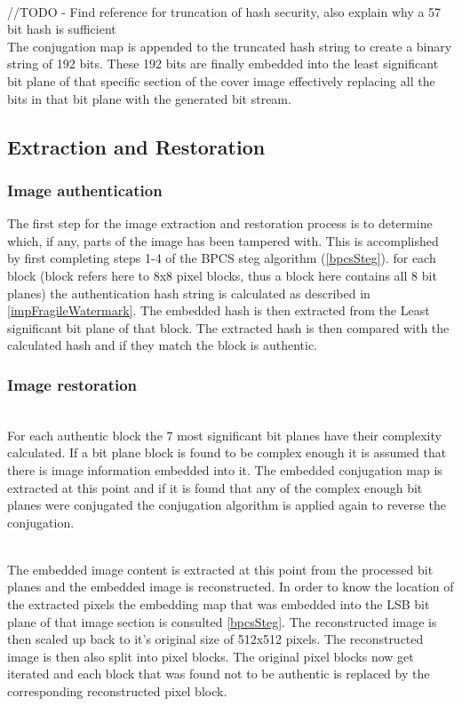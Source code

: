 \documentclass[12pt]{article}
\begin{document}
\hspace{0pt} \\
//TODO - Find reference for truncation of hash security, also explain why a 57 bit hash is sufficient
\hspace{0pt} \\

The conjugation map is appended to the truncated hash string to create a binary string of 192 bits.
These 192 bits are finally embedded into the least significant bit plane of that specific section of the cover image effectively replacing all the bits in that bit plane with the generated bit stream.

\subsection{Extraction and Restoration}
\label{extractRestore}
\subsubsection{Image authentication}
The first step for the image extraction and restoration process is to determine which, if any, parts of the image has been tampered with.
This is accomplished by first completing steps 1-4 of the BPCS steg algorithm (\ref{bpcsSteg}).
for each block (block refers here to 8x8 pixel blocks, thus a block here contains all 8 bit planes) the authentication hash string is calculated as described in \ref{impFragileWatermark}. 
The embedded hash is then extracted from the Least significant bit plane of that block.
The extracted hash is then compared with the calculated hash and if they match the block is authentic.

\subsubsection{Image restoration}
\hspace{0pt} \\
For each authentic block the 7 most significant bit planes have their complexity calculated.
If a bit plane block is found to be complex enough it is assumed that there is image information embedded into it.
The embedded conjugation map is extracted at this point and if it is found that any of the complex enough bit planes were conjugated the conjugation algorithm is applied again to reverse the conjugation.

\hspace{0pt} \\
The embedded image content is extracted at this point from the processed bit planes and the embedded image is reconstructed.
In order to know the location of the extracted pixels the embedding map that was embedded into the LSB bit plane of that image section is consulted \ref{bpcsSteg}.
The reconstructed image is then scaled up back to it's original size of 512x512 pixels.
The reconstructed image is then also split into pixel blocks.
The original pixel blocks now get iterated and each block that was found not to be authentic is replaced by the corresponding reconstructed pixel block. 
\end{document}
